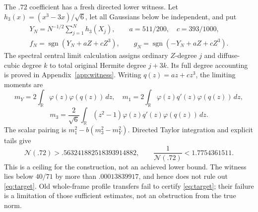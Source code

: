 \documentclass[11pt]{article}
\newcommand{\R}{\mathbb R}
\newcommand{\N}{\mathcal N}
\begin{document}
The $.72$ coefficient has a fresh directed lower witness. Let
$h_3(x)=(x^3-3x)/\sqrt6$, let all Gaussians below be independent, and put
\[
 \begin{gathered}
 Y_N=N^{-1/2}\sum_{j=1}^Nh_3(X_j),\qquad a=511/200,\quad c=393/1000,\\
 f_N=\operatorname{sgn}(Y_N+aZ+cZ^3),\qquad
 g_N=\operatorname{sgn}(-Y_N+aZ+cZ^3).
 \end{gathered}
\]
The spectral central limit calculation assigns ordinary $Z$-degree $j$
and diffuse-cubic degree $k$ to total original Hermite degree $j+3k$.
Its full degree accounting is proved in Appendix~\ref{app:witness}. Writing
$q(z)=az+cz^3$, the limiting moments are
\[
 m_Y=2\int_{\R}\varphi(z)\varphi(q(z))\,dz,\quad
 m_1=2\int_{\R}\varphi(z)q'(z)\varphi(q(z))\,dz,
\]
\[
 m_3=\frac{2}{\sqrt6}\int_{\R}
              (z^2-1)\varphi(z)q'(z)\varphi(q(z))\,dz.
\]
The scalar pairing is $m_1^2-b(m_3^2-m_Y^2)$. Directed Taylor
integration and explicit tails give
\begin{equation}\label{eq:new-witness}
 \N(.72)>.563241882518393914882,
 \qquad
 \frac1{\N(.72)}<1.7754361511.
\end{equation}
This is a ceiling for the construction, not an achieved lower bound.
The witness lies below $40/71$ by more than $.00013839917$, and hence
does not rule out \eqref{eq:target}. Old whole-frame profile transfers
fail to certify \eqref{eq:target}; their failure is a limitation of
those sufficient estimates, not an obstruction from the true norm.
\end{document}
